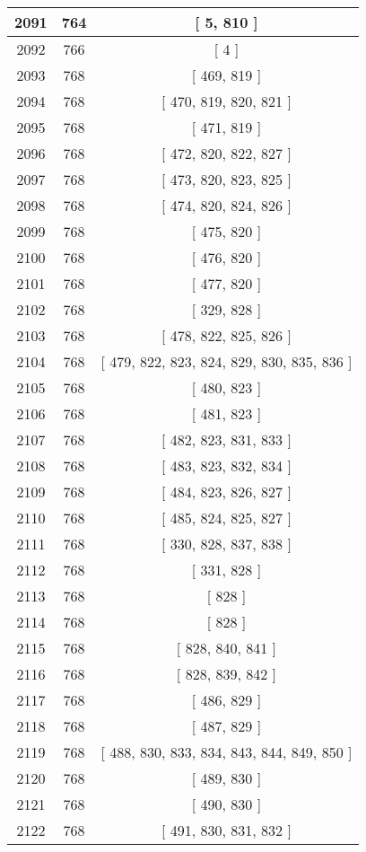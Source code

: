 \begin{center}
\begin{longtable}[H]{|| c c c ||}
\hline
2091 & 764 & [ 5, 810 ] \\ 
\hline
2092 & 766 & [ 4 ] \\ 
\hline
2093 & 768 & [ 469, 819 ] \\ 
\hline
2094 & 768 & [ 470, 819, 820, 821 ] \\ 
\hline
2095 & 768 & [ 471, 819 ] \\ 
\hline
2096 & 768 & [ 472, 820, 822, 827 ] \\ 
\hline
2097 & 768 & [ 473, 820, 823, 825 ] \\ 
\hline
2098 & 768 & [ 474, 820, 824, 826 ] \\ 
\hline
2099 & 768 & [ 475, 820 ] \\ 
\hline
2100 & 768 & [ 476, 820 ] \\ 
\hline
2101 & 768 & [ 477, 820 ] \\ 
\hline
2102 & 768 & [ 329, 828 ] \\ 
\hline
2103 & 768 & [ 478, 822, 825, 826 ] \\ 
\hline
2104 & 768 & [ 479, 822, 823, 824, 829, 830, 835, 836 ] \\ 
\hline
2105 & 768 & [ 480, 823 ] \\ 
\hline
2106 & 768 & [ 481, 823 ] \\ 
\hline
2107 & 768 & [ 482, 823, 831, 833 ] \\ 
\hline
2108 & 768 & [ 483, 823, 832, 834 ] \\ 
\hline
2109 & 768 & [ 484, 823, 826, 827 ] \\ 
\hline
2110 & 768 & [ 485, 824, 825, 827 ] \\ 
\hline
2111 & 768 & [ 330, 828, 837, 838 ] \\ 
\hline
2112 & 768 & [ 331, 828 ] \\ 
\hline
2113 & 768 & [ 828 ] \\ 
\hline
2114 & 768 & [ 828 ] \\ 
\hline
2115 & 768 & [ 828, 840, 841 ] \\ 
\hline
2116 & 768 & [ 828, 839, 842 ] \\ 
\hline
2117 & 768 & [ 486, 829 ] \\ 
\hline
2118 & 768 & [ 487, 829 ] \\ 
\hline
2119 & 768 & [ 488, 830, 833, 834, 843, 844, 849, 850 ] \\ 
\hline
2120 & 768 & [ 489, 830 ] \\ 
\hline
2121 & 768 & [ 490, 830 ] \\ 
\hline
2122 & 768 & [ 491, 830, 831, 832 ] \\ 

\end{longtable}
\end{center}
